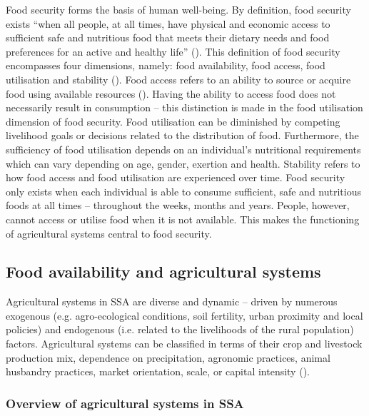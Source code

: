 Food security forms the basis of human well-being. By definition, food security exists ``when all people, at all times, have physical and economic access to sufficient safe and nutritious food that meets their dietary needs and food preferences for an active and healthy life'' (\citealp[p.~1]{FAO2008}). This definition of food security encompasses four dimensions, namely: food availability, food access, food utilisation and stability (\citealp{FAO2008}). Food access refers to an ability to source or acquire food using available resources (\citealp{Maxwell1992}). Having the ability to access food does not necessarily result in consumption -- this distinction is made in the food utilisation dimension of food security. Food utilisation can be diminished by competing livelihood goals or decisions related to the distribution of food. Furthermore, the sufficiency of food utilisation depends on an individual's nutritional requirements which can vary depending on age, gender, exertion and health. Stability refers to how food access and food utilisation are experienced over time. Food security only exists when each individual is able to consume sufficient, safe and nutritious foods at all times -- throughout the weeks, months and years. People, however, cannot access or utilise food when it is not available. This makes the functioning of agricultural systems central to food security.

\subsection{Food availability and agricultural systems}

Agricultural systems in SSA are diverse and dynamic -- driven by numerous exogenous (e.g. agro-ecological conditions, soil fertility, urban proximity and local policies) and endogenous (i.e. related to the livelihoods of the rural population) factors. Agricultural systems can be classified in terms of their crop and livestock production mix, dependence on precipitation, agronomic practices, animal husbandry practices, market orientation, scale, or capital intensity (\citealp{Garrity2012, Sere1996}).

\subsubsection{Overview of agricultural systems in SSA}

